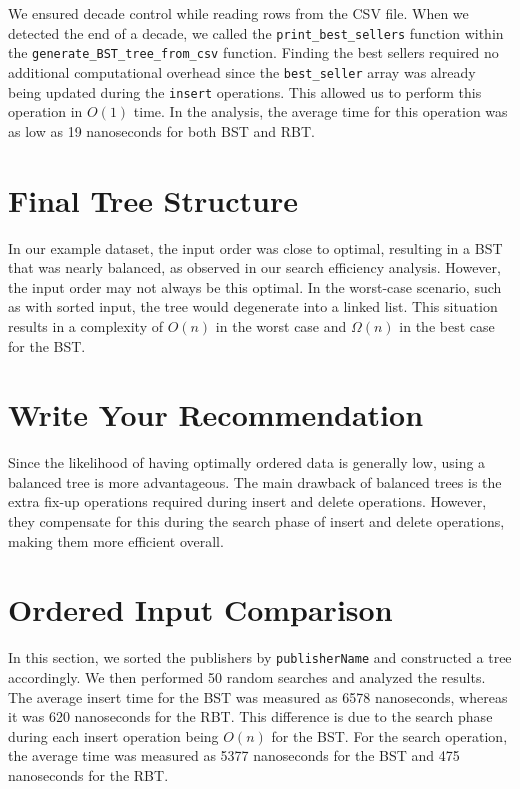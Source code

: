 We ensured decade control while reading rows from the CSV file. When we detected the end of a decade, we called the \texttt{print\_best\_sellers} function within the \texttt{generate\_BST\_tree\_from\_csv} function. Finding the best sellers required no additional computational overhead since the \texttt{best\_seller} array was already being updated during the \texttt{insert} operations. This allowed us to perform this operation in $O(1)$ time. In the analysis, the average time for this operation was as low as 19 nanoseconds for both BST and RBT.

\newpage

\section{Final Tree Structure}

In our example dataset, the input order was close to optimal, resulting in a BST that was nearly balanced, as observed in our search efficiency analysis. However, the input order may not always be this optimal. In the worst-case scenario, such as with sorted input, the tree would degenerate into a linked list. This situation results in a complexity of $O(n)$ in the worst case and $\Omega(n)$ in the best case for the BST.

\section{Write Your Recommendation}

Since the likelihood of having optimally ordered data is generally low, using a balanced tree is more advantageous. The main drawback of balanced trees is the extra fix-up operations required during insert and delete operations. However, they compensate for this during the search phase of insert and delete operations, making them more efficient overall.

\section{Ordered Input Comparison}

In this section, we sorted the publishers by \texttt{publisherName} and constructed a tree accordingly. We then performed 50 random searches and analyzed the results. The average insert time for the BST was measured as 6578 nanoseconds, whereas it was 620 nanoseconds for the RBT. This difference is due to the search phase during each insert operation being $O(n)$ for the BST. For the search operation, the average time was measured as 5377 nanoseconds for the BST and 475 nanoseconds for the RBT.